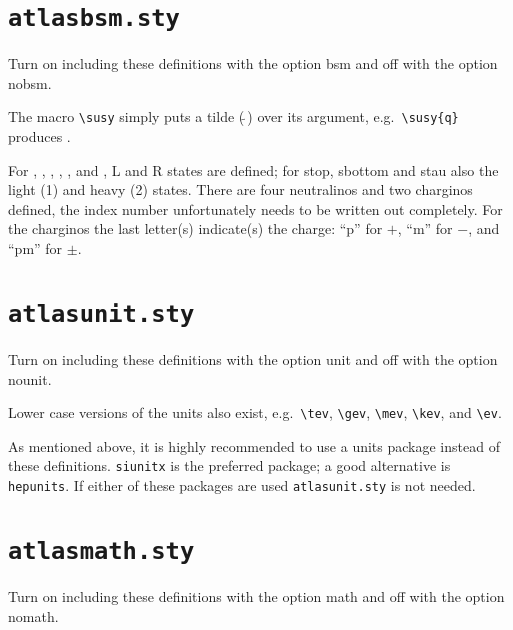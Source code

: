 \documentclass[koma,UKenglish]{latex/atlasdoc}
\newcommand{\File}[1]{\texttt{#1}\xspace}
\newcommand{\Macro}[1]{\texttt{\textbackslash #1}\xspace}
\newcommand{\Option}[1]{\textsf{#1}\xspace}
\newcommand{\Package}[1]{\texttt{#1}\xspace}
\begin{document}
{\newpage
\section{\File{atlasbsm.sty}}

Turn on including these definitions with the option \Option{bsm} and off with the option \Option{nobsm}.

The macro \Macro{susy} simply puts a tilde ($\tilde{\ }$) over its argument,
e.g.\ \verb|\susy{q}| produces .

For , , , \slepton, \sel, \smu and
\stau, L and R states are defined; for stop, sbottom and stau also the
light (1) and heavy (2) states.
There are four neutralinos and two charginos defined, 
the index number unfortunately needs to be written out completely. 
For the charginos the last letter(s) indicate(s) the charge: 
\enquote{p} for $+$, \enquote{m} for $-$, and \enquote{pm} for $\pm$.




\newpage
\section{\File{atlasunit.sty}}

Turn on including these definitions with the option \Option{unit} and off with the option \Option{nounit}.



\noindent Lower case versions of the units also exist, e.g.\ \verb|\tev|, \verb|\gev|, \verb|\mev|, \verb|\kev|, and
\verb|\ev|. 

As mentioned above, it is highly recommended to use a units package instead of
these definitions. \Package{siunitx} is the preferred package; a good alternative is \Package{hepunits}.
If either of these packages are used \File{atlasunit.sty} is not needed.


\newpage
\section{\File{atlasmath.sty}}

Turn on including these definitions with the option \Option{math} and off with the option \Option{nomath}.

}
\end{document}
